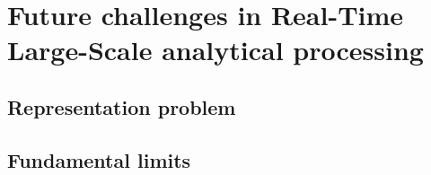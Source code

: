 \documentclass[]{book}    %
\begin{document}
\chapter{Future challenges in Real-Time Large-Scale analytical processing}
\section{Representation problem}
\section{Fundamental limits}




\backmatter 
\end{document}
